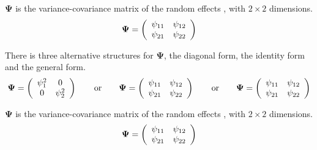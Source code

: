 \documentclass[12pt, a4paper]{report}
\theoremstyle{plain}
\theoremstyle{definition}
\theoremstyle{remark}
\begin{document}
	$\boldsymbol{\Psi}$ is the variance-covariance matrix of the random effects ,
	with $2 \times 2$ dimensions.
	\begin{equation}
	\boldsymbol{\Psi} =
	\left(%
	\begin{array}{c c}
	\psi_{11} & \psi_{12}  \\
	\psi_{21} & \psi_{22}  \\
	\end{array}%
	\right)
	\end{equation}
	

	
	\newpage
	
	
	


	
	There is three alternative structures for
	$\boldsymbol{\Psi}$, the diagonal form, the identity form and the general form.
	\[
	\boldsymbol{\Psi} =
	\left(%
	\begin{array}{c c}
	\psi^2_1 & 0  \\
	0 & \psi^2_2  \\
	\end{array}%
	\right)\qquad \mathrm{or} \qquad \boldsymbol{\Psi} =
	\left(%
	\begin{array}{c c}
	\psi_{11} & \psi_{12}  \\
	\psi_{21} & \psi_{22}  \\
	\end{array}%
	\right)
	\qquad \mathrm{or} \qquad \boldsymbol{\Psi} =
	\left(%
	\begin{array}{c c}
	\psi_{11} & \psi_{12}  \\
	\psi_{21} & \psi_{22}  \\
	\end{array}%
	\right)
	\]
	
	$\boldsymbol{\Psi}$ is the variance-covariance matrix of the random effects ,
	with $2 \times 2$ dimensions.
	\begin{equation}
	\boldsymbol{\Psi} =
	\left(%
	\begin{array}{c c}
	\psi_{11} & \psi_{12}  \\
	\psi_{21} & \psi_{22}  \\
	\end{array}%
	\right)
	\end{equation}
\end{document}
